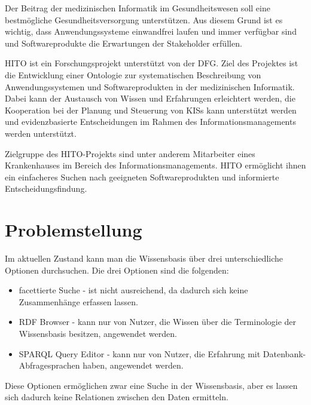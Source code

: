 
Der Beitrag der medizinischen Informatik im Gesundheitswesen soll eine bestmögliche Gesundheitsversorgung unterstützen.
Aus diesem Grund ist es wichtig, dass Anwendungssysteme einwandfrei laufen und immer verfügbar sind und Softwareprodukte die Erwartungen der Stakeholder erfüllen.

\ac{HITO} ist ein Forschungsprojekt unterstützt von der \ac{DFG}.
Ziel des Projektes ist die Entwicklung einer Ontologie zur systematischen Beschreibung von Anwendungssystemen und Softwareprodukten in der medizinischen Informatik.
Dabei kann der Austausch von Wissen und Erfahrungen erleichtert werden, die Kooperation bei der Planung und Steuerung von \acp{KIS} kann unterstützt werden und evidenzbasierte Entscheidungen im Rahmen des Informationsmanagements werden unterstützt.

Zielgruppe des HITO-Projekts sind unter anderem Mitarbeiter eines Krankenhauses im Bereich des Informationsmanagements. HITO ermöglicht ihnen ein einfacheres Suchen nach geeigneten Softwareprodukten und informierte Entscheidungsfindung.

\section{Problemstellung}\label{sec:problemstellung}


Im aktuellen Zustand kann man die Wissensbasis über drei unterschiedliche Optionen durchsuchen.
Die drei Optionen sind die folgenden:
\begin{itemize}
\item facettierte Suche - ist nicht ausreichend, da dadurch sich keine Zusammenhänge erfassen lassen.
\item RDF Browser - kann nur von Nutzer, die Wissen über die Terminologie der Wissensbasis besitzen, angewendet werden.
\item SPARQL Query Editor - kann nur von Nutzer, die Erfahrung mit Datenbank-Abfragesprachen haben, angewendet werden.
\end{itemize} 
Diese Optionen ermöglichen zwar eine Suche in der Wissensbasis, aber es lassen sich dadurch keine Relationen zwischen den Daten ermitteln.

